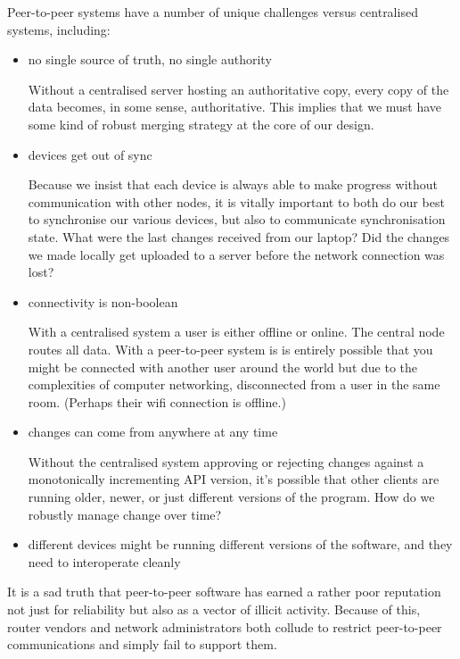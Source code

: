 \documentclass[sigplan,10pt]{acmart}
\begin{document}
Peer-to-peer systems have a number of unique challenges versus centralised systems, including:

\begin{itemize}
	\item no single source of truth, no single authority

	Without a centralised server hosting an authoritative copy, every copy of the data becomes, in some sense, authoritative. This implies that we must have some kind of robust merging strategy at the core of our design.
	\item devices get out of sync

    Because we insist that each device is always able to make progress without communication with other nodes, it is vitally important to both do our best to synchronise our various devices, but also to communicate synchronisation state. What were the last changes received from our laptop? Did the changes we made locally get uploaded to a server before the network connection was lost?  

    \item connectivity is non-boolean

    With a centralised system a user is either offline or online. The central node routes all data. With a peer-to-peer system is is entirely possible that you might be connected with another user around the world but due to the complexities of computer networking, disconnected from a user in the same room. (Perhaps their wifi connection is offline.) 

    \item changes can come from anywhere at any time

    Without the centralised system approving or rejecting changes against a monotonically incrementing API version, it's possible that other clients are running older, newer, or just different versions of the program. How do we robustly manage change over time?
    
    \item different devices might be running different versions of the software, and they need to interoperate cleanly
\end{itemize}

It is a sad truth that peer-to-peer software has earned a rather poor reputation not just for reliability but also as a vector of illicit activity. Because of this, router vendors and network administrators both collude to restrict peer-to-peer communications and simply fail to support them.
\end{document}
